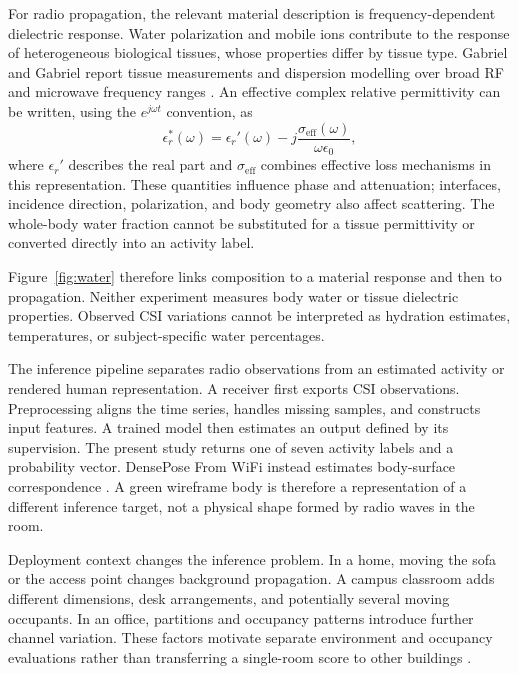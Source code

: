 \documentclass[a4paper,11pt,fleqn]{mira-author}
\begin{document}
For radio propagation, the relevant material description is frequency-dependent dielectric response. Water polarization and mobile ions contribute to the response of heterogeneous biological tissues, whose properties differ by tissue type. Gabriel and Gabriel report tissue measurements and dispersion modelling over broad RF and microwave frequency ranges \cite{gabriel1996}. An effective complex relative permittivity can be written, using the $e^{j\omega t}$ convention, as
\begin{equation}
\epsilon_r^*(\omega)=\epsilon_r'(\omega)
 -j\frac{\sigma_{\mathrm{eff}}(\omega)}{\omega\epsilon_0},
\end{equation}
where $\epsilon_r'$ describes the real part and $\sigma_{\mathrm{eff}}$ combines effective loss mechanisms in this representation. These quantities influence phase and attenuation; interfaces, incidence direction, polarization, and body geometry also affect scattering. The whole-body water fraction cannot be substituted for a tissue permittivity or converted directly into an activity label.

Figure~\ref{fig:water} therefore links composition to a material response and then to propagation. Neither experiment measures body water or tissue dielectric properties. Observed CSI variations cannot be interpreted as hydration estimates, temperatures, or subject-specific water percentages.



The inference pipeline separates radio observations from an estimated activity or rendered human representation. A receiver first exports CSI observations. Preprocessing aligns the time series, handles missing samples, and constructs input features. A trained model then estimates an output defined by its supervision. The present study returns one of seven activity labels and a probability vector. DensePose From WiFi instead estimates body-surface correspondence \cite{geng2022}. A green wireframe body is therefore a representation of a different inference target, not a physical shape formed by radio waves in the room. 



Deployment context changes the inference problem. In a home, moving the sofa or the access point changes background propagation. A campus classroom adds different dimensions, desk arrangements, and potentially several moving occupants. In an office, partitions and occupancy patterns introduce further channel variation. These factors motivate separate environment and occupancy evaluations rather than transferring a single-room score to other buildings \cite{guarino2026}.
\end{document}
